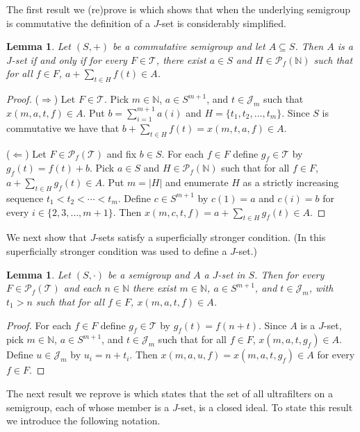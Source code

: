 \documentclass[12pt,showtrims]{memoir}
\theoremstyle{plain}
\newtheorem{lem}[thm]{Lemma}
\theoremstyle{definition}
\newcommand{\bbN}{\mathbb{N}}
\newcommand{\calJ}{\mathcal{J}}
\newcommand{\calT}{\mathcal{T}}
\newcommand{\Pf}{\mathcal{P}_f}
\begin{document}
The first result we (re)prove is \cite[Lemma 2.4]{Hindman:2010fk} which shows that when the underlying semigroup is commutative the definition of a $J$-set is considerably simplified. 

\begin{lem}
  Let $(S, +)$ be a commutative semigroup and let $A \subseteq S$. 
  Then $A$ is a $J$-set if and only if for every $F \in \calT$, there exist $a \in S$ and $H \in \Pf(\bbN)$ such that for all $f \in F$, $a + \sum_{t \in H} f(t) \in A$.
\end{lem}
\begin{proof}
  ($\Rightarrow$)
  Let $F \in \calT$.
  Pick $m \in \bbN$, $a \in S^{m+1}$, and $t \in \calJ_m$ such that $x(m, a, t, f) \in A$.
  Put $b = \sum_{i=1}^{m+1} a(i)$ and $H = \{t_1, t_2, \ldots, t_m\}$.
  Since $S$ is commutative we have that $b + \sum_{t \in H} f(t) = x(m, t, a, f) \in A$.

  ($\Leftarrow$)
  Let $F \in \Pf(\calT)$ and fix $b \in S$.
  For each $f \in F$ define $g_f \in \calT$ by $g_f(t) = f(t)+b$. 
  Pick $a \in S$ and $H \in \Pf(\bbN)$ such that for all $f \in F$, $a + \sum_{t \in H} g_f(t) \in A$. 
  Put $m = |H|$ and enumerate $H$ as a strictly increasing sequence $t_1 < t_2 < \cdots < t_m$. 
  Define $c \in S^{m+1}$ by $c(1) = a$ and $c(i) = b$ for every $i \in \{2, 3, \ldots, m+1\}$.
  Then $x(m, c, t, f) = a + \sum_{t \in H} g_f(t) \in A$.
\end{proof}

We next show that $J$-sets satisfy a superficially stronger condition. 
(In \cite[Definition 3.3(e)]{De:2008uq} this superficially stronger condition was used to define a $J$-set.)

\begin{lem}
  \label{lem:jset-start}
  Let $(S, \cdot)$ be a semigroup and $A$ a $J$-set in $S$.
  Then for every $F \in \Pf(\calT)$ and each $n \in \bbN$ there exist $m \in \bbN$, $a \in S^{m+1}$, and $t \in \calJ_m$, with $t_1 > n$ such that for all $f \in F$, $x(m, a, t, f) \in A$.
\end{lem}
\begin{proof}
  For each $f \in F$ define $g_f \in \calT$ by $g_f(t) = f(n+t)$.
  Since $A$ is a $J$-set, pick $m \in \bbN$, $a \in S^{m+1}$, and $t \in \calJ_m$ such that for all $f \in F$, $x(m, a, t, g_f) \in A$. 
  Define $u \in \calJ_m$ by $u_i =  n + t_i$.
  Then $x(m, a, u, f) = x(m, a, t, g_f) \in A$ for every $f \in F$.
\end{proof}

The next result we reprove is \cite[Theorem 3.4]{De:2008uq} which states that the set of all ultrafilters on a semigroup, each of whose member is a $J$-set, is a closed ideal.
To state this result we introduce the following notation.
\end{document}

